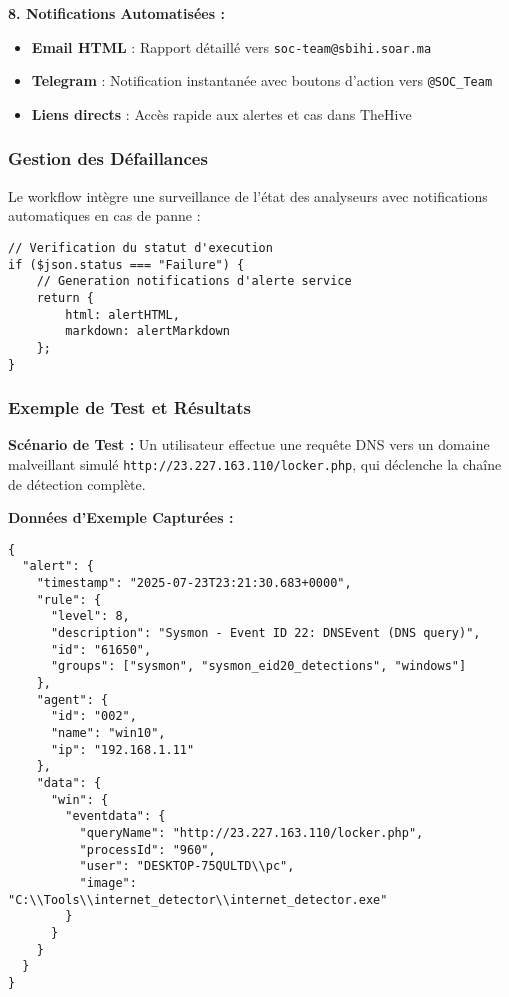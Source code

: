 \textbf{8. Notifications Automatisées :}
\begin{itemize}
    \item \textbf{Email HTML} : Rapport détaillé vers \texttt{soc-team@sbihi.soar.ma}
    \item \textbf{Telegram} : Notification instantanée avec boutons d'action vers \texttt{@SOC\_Team}
    \item \textbf{Liens directs} : Accès rapide aux alertes et cas dans TheHive
\end{itemize}

\subsubsection{Gestion des Défaillances}

Le workflow intègre une surveillance de l'état des analyseurs avec notifications automatiques en cas de panne :

\begin{lstlisting}[style=JSStyle, caption=Détection panne analyseur, label=lst:analyzer-fail]
// Verification du statut d'execution
if ($json.status === "Failure") {
    // Generation notifications d'alerte service
    return {
        html: alertHTML,
        markdown: alertMarkdown
    };
}
\end{lstlisting}

\subsubsection{Exemple de Test et Résultats}

\textbf{Scénario de Test :}
Un utilisateur effectue une requête DNS vers un domaine malveillant simulé \texttt{http://23.227.163.110/locker.php}, qui déclenche la chaîne de détection complète.

\textbf{Données d'Exemple Capturées :}

\begin{lstlisting}[style=JSONStyle, caption=Alerte DNS Wazuh, label=lst:dns-alert]
{
  "alert": {
    "timestamp": "2025-07-23T23:21:30.683+0000",
    "rule": {
      "level": 8,
      "description": "Sysmon - Event ID 22: DNSEvent (DNS query)",
      "id": "61650",
      "groups": ["sysmon", "sysmon_eid20_detections", "windows"]
    },
    "agent": {
      "id": "002",
      "name": "win10",
      "ip": "192.168.1.11"
    },
    "data": {
      "win": {
        "eventdata": {
          "queryName": "http://23.227.163.110/locker.php",
          "processId": "960",
          "user": "DESKTOP-75QULTD\\pc",
          "image": "C:\\Tools\\internet_detector\\internet_detector.exe"
        }
      }
    }
  }
}
\end{lstlisting}

